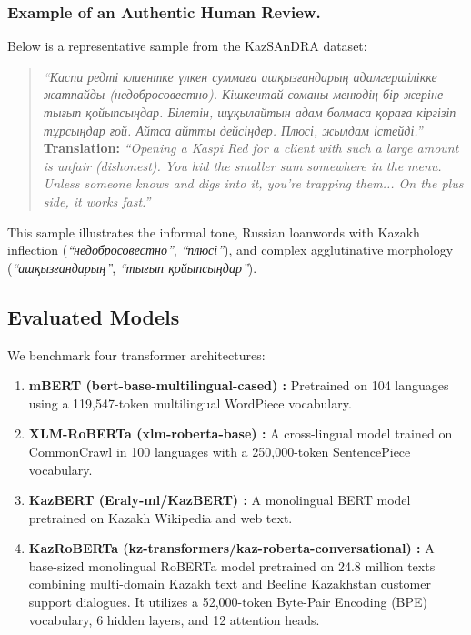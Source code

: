 \documentclass[runningheads]{llncs}
\begin{document}
\subsubsection{Example of an Authentic Human Review.}
Below is a representative sample from the KazSAnDRA dataset:
\begin{quote}
\textit{``Каспи редті клиентке үлкен суммаға ашқызғандарың адамгершілікке жатпайды (недобросовестно). Кішкентай соманы менюдің бір жеріне тығып қойыпсыңдар. Білетін, шұқылайтын адам болмаса қораға кіргізіп тұрсыңдар ғой. Айтса айтты дейсіңдер. Плюсі, жылдам істейді.''} \\
\textbf{Translation:} \textit{``Opening a Kaspi Red for a client with such a large amount is unfair (dishonest). You hid the smaller sum somewhere in the menu. Unless someone knows and digs into it, you're trapping them... On the plus side, it works fast.''}
\end{quote}
This sample illustrates the informal tone, Russian loanwords with Kazakh inflection (\textit{``недобросовестно''}, \textit{``плюсі''}), and complex agglutinative morphology (\textit{``ашқызғандарың''}, \textit{``тығып қойыпсыңдар''}).

\subsection{Evaluated Models}
We benchmark four transformer architectures:
\begin{enumerate}
\item \textbf{mBERT (bert-base-multilingual-cased) \cite{2}:} Pretrained on 104 languages using a 119,547-token multilingual WordPiece vocabulary.
\item \textbf{XLM-RoBERTa (xlm-roberta-base) \cite{3}:} A cross-lingual model trained on CommonCrawl in 100 languages with a 250,000-token SentencePiece vocabulary.
\item \textbf{KazBERT (Eraly-ml/KazBERT) \cite{4}:} A monolingual BERT model pretrained on Kazakh Wikipedia and web text.
\item \textbf{KazRoBERTa (kz-transformers/kaz-roberta-conversational) \cite{5}:} A base-sized monolingual RoBERTa model pretrained on 24.8 million texts combining multi-domain Kazakh text and Beeline Kazakhstan customer support dialogues. It utilizes a 52,000-token Byte-Pair Encoding (BPE) vocabulary, 6 hidden layers, and 12 attention heads.
\end{enumerate}
\end{document}

